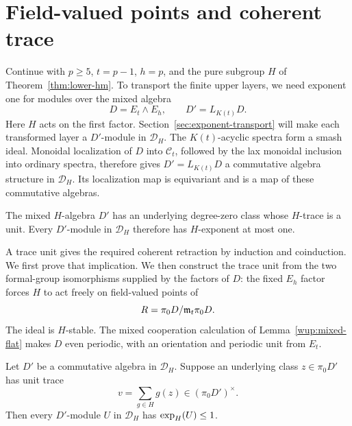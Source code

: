 \section{Field-valued points and coherent trace}\label{sec:coherent-trace}

Continue with $p\geq5$, $t=p-1$, $h=p$, and the pure subgroup $H$
of Theorem~\ref{thm:lower-hm}. To transport the finite upper layers,
we need exponent one for modules over the mixed algebra
\[
 D=E_t\wedge E_h,\qquad D'=L_{K(t)}D.
\]
Here $H$ acts on the first factor. Section~\ref{sec:exponent-transport}
will make each transformed layer a $D'$-module in $\mathcal D_H$.
The \(K(t)\)-acyclic spectra form a smash ideal. Monoidal localization
of \(D\) into \(\mathcal C_t\), followed by the lax monoidal inclusion
into ordinary spectra, therefore gives \(D'=L_{K(t)}D\) a commutative
algebra structure in \(\mathcal D_H\). Its localization map is
equivariant and is a map of these commutative algebras.

\begin{proposition}\label{wup:completed-trace}
The mixed $H$-algebra $D'$ has an underlying degree-zero class whose
$H$-trace is a unit.
Every \(D'\)-module in \(\mathcal D_H\) therefore has
\(H\)-exponent at most one.
\end{proposition}

A trace unit gives the required coherent retraction by induction and
coinduction. We first prove that implication. We then construct the
trace unit from the two formal-group isomorphisms supplied by the
factors of $D$: the fixed $E_h$ factor forces $H$ to act freely on
field-valued points of
\[
 R=\pi_0D/\mathfrak m_t\pi_0D.
\]
The ideal is $H$-stable. The mixed cooperation calculation
of Lemma~\ref{wup:mixed-flat} makes $D$ even periodic, with an
orientation and periodic unit from $E_t$.

\begin{lemma}\label{wup:trace-split}
Let \(D'\) be a commutative algebra in \(\mathcal D_H\). Suppose an
underlying class \(z\in\pi_0D'\) has unit trace
\[
 v=\sum_{g\in H}g(z)\in(\pi_0D')^\times.
\]
Then every \(D'\)-module \(U\) in \(\mathcal D_H\) has
\(\operatorname{exp}_H(U)\leq1\).
\end{lemma}

